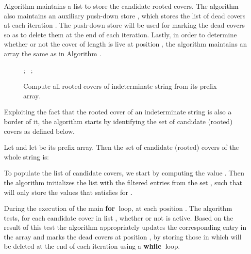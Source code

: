 \documentclass[runningheads,a4paper]{llncs}
\def\s#1{\mbox{\boldmath }}
\def\bfor{{\bf for\ }}
\def\bwhile{{\bf while\ }}
\def\bor{{\bf or\ }}
\def\bbreak{{\bf break\ }}
\begin{document}
Algorithm  maintains a list  to store the candidate rooted
covers. The algorithm also maintains an auxiliary  push-down store , which stores the list of dead covers at each iteration .  The
push-down store  will be used for marking the dead covers so as to
delete them at the end of each iteration. Lastly, in order to determine whether
or not the cover of length  is live at position , the algorithm maintains
an array  the same as in Algorithm .


\begin{figure}[t!]
\begin{algorithmic}
\Procedure{\bf{}}{}
\State ; \ ; \  \State 
{}
\For{}
\If{}
\State 
\EndIf
\EndFor
\For{}
\State 
\ForAll{}
\If{}
\State \bbreak
\EndIf
\State 
\If{( \State \bor
)}
\State 
\Else
{}
\State 
{}
\State 
\EndIf
\EndFor
{}
\While{}
\State 
\State 
\EndWhile
\EndFor
{}
\For{}
\If{}
\State 
\EndIf
\EndFor
\EndProcedure
\end{algorithmic}
\caption{Compute all rooted covers of indeterminate string from its prefix
array.}
\label{algo-position-array}
\end{figure}

Exploiting the fact that the rooted cover of an
indeterminate string \s{x} is also a border of it, the algorithm
starts by identifying the set of candidate (rooted) covers as defined below.
 
\begin{definition}
Let  and let  be its prefix array. Then the
set of candidate (rooted) covers  of the whole string  is:


\end{definition}

To populate the list of candidate covers, we start by computing the value
. Then the algorithm initializes the list  with the filtered entries from the set , such that  will only store the values that satisfies  for .


During the execution of the main \bfor loop, at each position .
The algorithm tests, for each candidate cover  in list , whether
or not  is active.
Based on the result of this test the algorithm appropriately updates the
corresponding entry in the  array and marks the dead covers at position
, by storing those in  which will be
deleted at the end of each iteration using a \bwhile loop.
\end{document}
